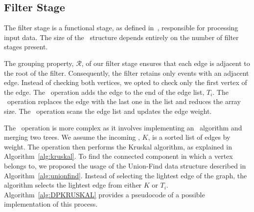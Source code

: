 \subsection*{Filter Stage}

The filter stage is a functional stage, as defined in~\cite{Pasarella2024}, responsible for processing input data. The size of the \DPmst\ structure depends entirely on the number of filter stages present.

The grouping property, $\mathcal{R}$, of our filter stage ensures that each edge is adjacent to the root of the filter. Consequently, the filter retains only events with an adjacent edge. Instead of checking both vertices, we opted to check only the first vertex of the edge. The \opinsert\ operation adds the edge to the end of the edge list, $T_i$. The \opremove\ operation replaces the edge with the last one in the list and reduces the array size. The \opupdate\ operation scans the edge list and updates the edge weight.

The \opmst\ operation is more complex as it involves implementing an \mst\ algorithm and merging two trees. We assume the incoming \mst, $K$, is a sorted list of edges by weight. The operation then performs the Kruskal algorithm, as explained in Algorithm~\ref{alg:kruskal}. To find the connected component in which a vertex belongs to, we proposed the usage of the Union-Find data structure described in Algorithm~\ref{alg:unionfind}. Instead of selecting the lightest edge of the graph, the algorithm selects the lightest edge from either $K$ or $T_i$. Algorithm~\ref{alg:DPKRUSKAL} provides a pseudocode of a possible implementation of this process.

